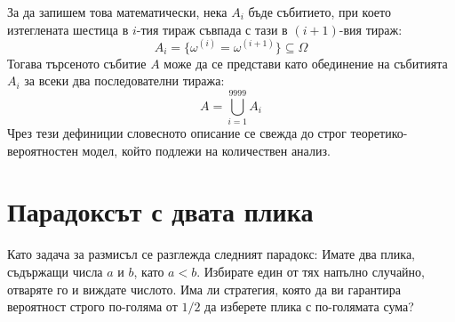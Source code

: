 \documentclass{article}
\begin{document}
За да запишем това математически, нека $A_i$ бъде събитието, при което изтеглената шестица в $i$-тия тираж съвпада с тази в $(i+1)$-вия тираж:
\[ A_i = \{ \omega^{(i)} = \omega^{(i+1)} \} \subseteq \Omega \]
Тогава търсеното събитие $A$ може да се представи като обединение на събитията $A_i$ за всеки два последователни тиража:
\[ A = \bigcup_{i=1}^{9999} A_i \]
Чрез тези дефиниции словесното описание се свежда до строг теоретико-вероятностен модел, който подлежи на количествен анализ.

\section{Парадоксът с двата плика}
Като задача за размисъл се разглежда следният парадокс:
Имате два плика, съдържащи числа $a$ и $b$, като $a < b$. Избирате един от тях напълно случайно, отваряте го и виждате числото. Има ли стратегия, която да ви гарантира вероятност строго по-голяма от $1/2$ да изберете плика с по-голямата сума?
\end{document}
